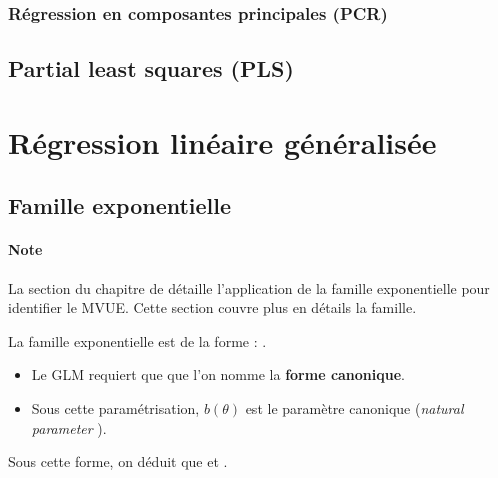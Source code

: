 \documentclass[french]{article}
\begin{document}
\begin{multicols*}{2}
\subsubsection{Régression en composantes principales (PCR)}


\subsection{Partial least squares (PLS)}




\newpage
\section{Régression linéaire généralisée}\label{sec:GLM}

\subsection{Famille exponentielle}\label{subsec:ExpFamRegr}
\paragraph{Note}	La section \underline{\textit{}} du chapitre de \underline{\textit{}} détaille l'application de la famille exponentielle pour identifier le MVUE. Cette section couvre plus en détails la famille.

\bigskip

La famille exponentielle est de la forme : .
\begin{itemize}
	\item	Le GLM requiert que  que l'on nomme la \textbf{forme canonique}.
	\item	Sous cette paramétrisation, $b(\theta)$ est le paramètre canonique (\og \textit{natural parameter} \fg{}).
\end{itemize}

Sous cette forme, on déduit que  et .


\end{multicols*}
\end{document}
